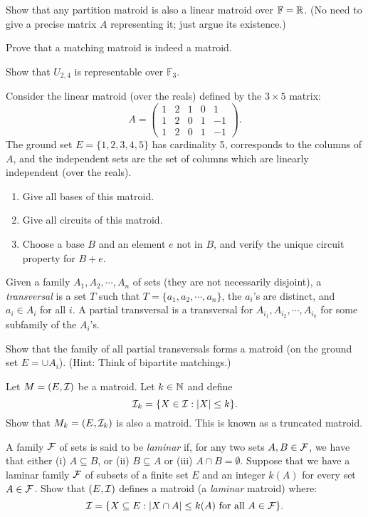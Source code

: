\documentclass[12pt]{article}
\newcommand{\F}{{\mathbb F}}
\begin{document}
\begin{exercises}
\item
Show that any partition matroid is also a linear matroid over $\F=\R$. (No need to
give a precise matrix $A$ representing it; just argue its existence.) 
\item
Prove that a matching matroid is indeed a matroid. 
\item
Show that $U_{2,4}$ is representable over $\F_3$.
\item
Consider the linear matroid (over the reals) defined by the $3\times
5$ matrix:
$$A=\left(\begin{array}{ccccc}
1 & 2 & 1 & 0 & 1 \\
1 & 2 & 0 & 1 & -1 \\
1 & 2 & 0 & 1 & -1 
\end{array}\right).$$
The ground set $E=\{1,2,3,4,5\}$ has cardinality 5, corresponds to the
columns of $A$, and the independent sets are the set of columns which
are linearly independent (over the reals). 
\begin{enumerate}
\item
Give all bases of this matroid.
\item
Give all circuits of this matroid. 
\item 
Choose a base $B$ and an element $e$ not in $B$, and verify the unique
circuit property for $B+e$.
\end{enumerate}

\item
Given a family $A_1, A_2, \cdots, A_n$ of sets (they are not
necessarily disjoint), a {\it transversal} is a set $T$ such that
$T=\{a_1, a_2, \cdots, a_n\}$, the $a_i$'s are distinct, and $a_i\in
A_i$ for all $i$. A partial transversal is a transversal for $A_{i_1},
A_{i_2}, \cdots, A_{i_k}$ for some subfamily of the $A_i$'s. 

Show that the family of all partial transversals forms a matroid (on
the ground set $E=\cup A_i$). (Hint: Think of bipartite matchings.)  

\item \label{ex:truncated}
Let $M=(E,{\cal I})$ be a matroid. Let $k\in {\mathbb N}$ and define $${\cal
  I}_k=\{X\in {\cal I}: |X|\leq k \}.$$ Show that $M_k=(E,{\cal I}_k)$
  is also a matroid. This is known as a truncated matroid. 

\item \label{ex:laminar}
A family ${\cal F}$ of sets is said to be {\it laminar} if, for any
two sets $A, B\in {\cal F}$, we have that either (i) $A\subseteq B$,
or (ii) $B\subseteq A$ or (iii) $A\cap B=\emptyset$. Suppose that we
have a laminar family ${\cal F}$ of subsets of a finite set $E$ and an integer $k(A)$ for
every set $A\in {\cal F}$. Show that $(E, {\cal I})$ defines a matroid
(a {\it laminar} matroid) where:
$${\cal I} =\{X\subseteq E: |X\cap A|\leq k(A) \mbox{ for all } A \in
{\cal F}\}.$$

\end{exercises}
\end{document}
